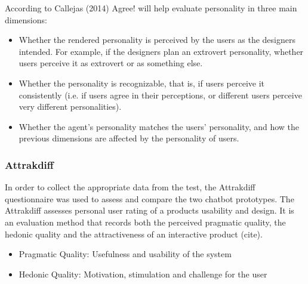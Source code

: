      According to Callejas (2014) Agree! will help evaluate personality in three main dimensions:
    
        \begin{itemize}
            \item Whether the rendered personality is perceived by the users as the designers intended. For example, if the designers plan an extrovert personality, whether users perceive it as extrovert or as something else.
            \item Whether the personality is recognizable, that is, if users perceive it consistently (i.e. if users agree in their perceptions, or different users perceive very different personalities).
            \item Whether the agent's personality matches the users' personality, and how the previous dimensions are affected by the personality of users.
        \end{itemize}
            
    \vspace{5mm} %
   
     \subsubsection{Attrakdiff}
    
    In order to collect the appropriate data from the test, the Attrakdiff questionnaire was used to assess and compare the two chatbot prototypes. The Attrakdiff assesses personal user rating of a products usability and design. It is an evaluation method that records both the perceived pragmatic quality, the hedonic quality and the attractiveness of an interactive product (cite).
    
        \begin{itemize}
            \item Pragmatic Quality: Usefulness and usability of the system
            \item Hedonic Quality: Motivation, stimulation and challenge for the user
        \end{itemize}
    

   